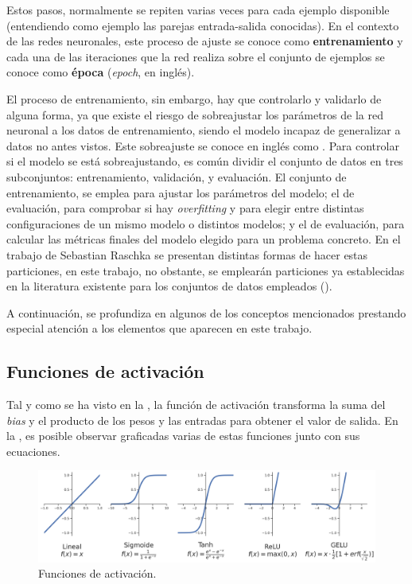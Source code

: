Estos pasos, normalmente se repiten varias veces para cada ejemplo disponible (entendiendo como ejemplo las parejas entrada-salida conocidas). En el contexto de las redes neuronales, este proceso de ajuste se conoce como \textbf{entrenamiento} y cada una de las iteraciones que la red realiza sobre el conjunto de ejemplos se conoce como \textbf{época} (\textit{epoch}, en inglés). 

El proceso de entrenamiento, sin embargo, hay que controlarlo y validarlo de alguna forma, ya que existe el riesgo de sobreajustar los parámetros de la red neuronal a los datos de entrenamiento, siendo el modelo incapaz de generalizar a datos no antes vistos. Este sobreajuste se conoce en inglés como . Para controlar si el modelo se está sobreajustando, es común dividir el conjunto de datos en tres subconjuntos: entrenamiento, validación, y evaluación. El conjunto de entrenamiento, se emplea para ajustar los parámetros del modelo; el de evaluación, para comprobar si hay \textit{overfitting} y para elegir entre distintas configuraciones de un mismo modelo o distintos modelos; y el de evaluación, para calcular las métricas finales del modelo elegido para un problema concreto. En el trabajo de Sebastian Raschka \cite{model-evaluation} se presentan distintas formas de hacer estas particiones, en este trabajo, no obstante, se emplearán particiones ya establecidas en la literatura existente para los conjuntos de datos empleados ().

A continuación, se profundiza en algunos de los conceptos mencionados prestando especial atención a los elementos que aparecen en este trabajo.

\subsection{Funciones de activación}
Tal y como se ha visto en la , la función de activación transforma la suma del \textit{bias} y el producto de los pesos y las entradas para obtener el valor de salida. En la , es posible observar graficadas varias de estas funciones junto con sus ecuaciones.

\begin{figure}[H]
\centering
\includegraphics[width=\linewidth]{imagenes/funciones_activacion.png} 
\captionsetup{width=.8\linewidth}
\caption{Funciones de activación.}
\label{fig:funciones-activacion}
\end{figure}

